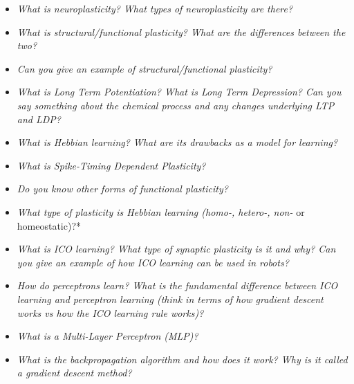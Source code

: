 \documentclass[
    fontsize      = 11pt,
    paper         = a4,
    twoside       = false,
    parskip       = half,
    pagesize      = false,
]{scrartcl}
\begin{document}
\begin{itemize}
\item
  \emph{What is neuroplasticity? What types of neuroplasticity are
  there?}
\item
  \emph{What is structural/functional plasticity? What are the
  differences between the two?}
\item
  \emph{Can you give an example of structural/functional plasticity?}
\item
  \emph{What is Long Term Potentiation? What is Long Term Depression?
  Can you say something about the chemical process and any changes
  underlying LTP and LDP?}
\item
  \emph{What is Hebbian learning? What are its drawbacks as a model for
  learning?}
\item
  \emph{What is Spike-Timing Dependent Plasticity?}
\item
  \emph{Do you know other forms of functional plasticity?}
\item
  \emph{What type of plasticity is Hebbian learning (homo-, hetero-,
  non- }or homeostatic)?*
\item
  \emph{What is ICO learning? What type of synaptic plasticity is it and
  why? Can you give an example of how ICO learning can be used in
  robots?}
\item
  \emph{How do perceptrons learn? What is the fundamental difference
  between ICO learning and perceptron learning (think in terms of how
  gradient descent works vs how the ICO learning rule works)?}
\item
  \emph{What is a Multi-Layer Perceptron (MLP)?}
\item
  \emph{What is the backpropagation algorithm and how does it work? Why
  is it called a gradient descent method?}
\end{itemize}
\end{document}
